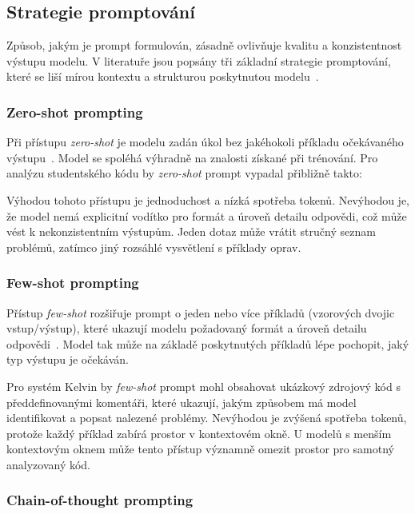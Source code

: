 \subsection{Strategie promptování}
\label{subsec:prompts-strategies}

Způsob, jakým je prompt formulován, zásadně ovlivňuje kvalitu a konzistentnost výstupu modelu.
V literatuře jsou popsány tři základní strategie promptování, které se liší mírou kontextu a strukturou poskytnutou modelu~\cite{brown-gpt3,wei-cot}.

\subsubsection*{Zero-shot prompting}
\label{subsubsec:prompts-strategies-zero-shot}

Při přístupu \textit{zero-shot} je modelu zadán úkol bez jakéhokoli příkladu očekávaného výstupu~\cite{kojima-zeroshot}.
Model se spoléhá výhradně na znalosti získané při trénování.
Pro analýzu studentského kódu by \textit{zero-shot} prompt vypadal přibližně takto: 

Výhodou tohoto přístupu je jednoduchost a nízká spotřeba tokenů.
Nevýhodou je, že model nemá explicitní vodítko pro formát a úroveň detailu odpovědi, což může vést k nekonzistentním výstupům.
Jeden dotaz může vrátit stručný seznam problémů, zatímco jiný rozsáhlé vysvětlení s příklady oprav.

\subsubsection*{Few-shot prompting}
\label{subsubsec:prompts-strategies-few-shot}

Přístup \textit{few-shot} rozšiřuje prompt o jeden nebo více příkladů (vzorových dvojic vstup/výstup), které ukazují modelu požadovaný formát a úroveň detailu odpovědi~\cite{brown-gpt3}.
Model tak může na základě poskytnutých příkladů lépe pochopit, jaký typ výstupu je očekáván.

Pro systém Kelvin by \textit{few-shot} prompt mohl obsahovat ukázkový zdrojový kód s předdefinovanými komentáři, které ukazují, jakým způsobem má model identifikovat a popsat nalezené problémy.
Nevýhodou je zvýšená spotřeba tokenů, protože každý příklad zabírá prostor v kontextovém okně.
U modelů s menším kontextovým oknem může tento přístup významně omezit prostor pro samotný analyzovaný kód.

\subsubsection*{Chain-of-thought prompting}
\label{subsubsec:prompts-strategies-chain-of-thought}

